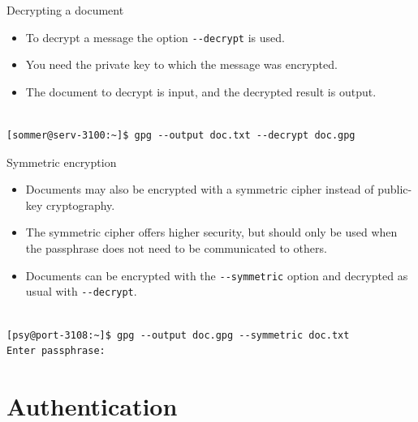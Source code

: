 \documentclass[%
mode=present,%
paper=smartboard,
size=20pt,
]{powerdot}
\newcommand{\clopt}[1]{\texttt{{-}#1}}
\begin{document}
\begin{slide}[method=direct]{Decrypting a document}
  \begin{itemize}
  \item To decrypt a message the option \clopt{-decrypt} is used.
  \item You need the private key to which the message was encrypted.
  \item The document to decrypt is input, and the decrypted result is
    output.
  \end{itemize}
\begin{verbatim}

[sommer@serv-3100:~]$ gpg --output doc.txt --decrypt doc.gpg
\end{verbatim}%
\end{slide}

\begin{slide}[method=direct]{Symmetric encryption}
  \begin{itemize}
  \item Documents may also be encrypted with a symmetric cipher
    instead of public-key cryptography.
  \item The symmetric cipher offers higher security, but should only
    be used when the passphrase does not need to be communicated to
    others.
  \item Documents can be encrypted with the \clopt{-symmetric} option
    and decrypted as usual with \clopt{-decrypt}.
  \end{itemize}
\begin{verbatim}

[psy@port-3108:~]$ gpg --output doc.gpg --symmetric doc.txt
Enter passphrase:
\end{verbatim}%
\end{slide}

\section{Authentication}
\end{document}
